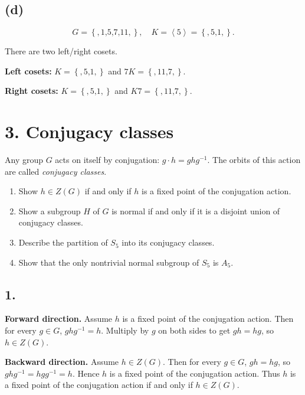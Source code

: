 \subsection{(d)}

\[G = \left\{ {,1\text{,}5\text{,}7\text{,}11,} \right\},\quad K = \left\langle 5 \right\rangle = \left\{ {,5\text{,}1,} \right\}.\]

There are two left/right cosets.

\textbf{Left cosets:} \(K = \left\{ {,5\text{,}1,} \right\}\) and \(7K = \left\{ {,11\text{,}7,} \right\}\).

\textbf{Right cosets:} \(K = \left\{ {,5\text{,}1,} \right\}\) and \(K7 = \left\{ {,11\text{,}7,} \right\}\).

\section{3. Conjugacy classes}

Any group \(G\) acts on itself by conjugation: \(g \cdot h = ghg^{- 1}\). The orbits of this action are called \emph{conjugacy classes}.

\begin{enumerate}
\tightlist
\item
  Show \(h \in Z(G)\) if and only if \(h\) is a fixed point of the conjugation action.
\item
  Show a subgroup \(H\) of \(G\) is normal if and only if it is a disjoint union of conjugacy classes.
\item
  Describe the partition of \(S_{5}\) into its conjugacy classes.
\item
  Show that the only nontrivial normal subgroup of \(S_{5}\) is \(A_{5}\).
\end{enumerate}

\subsection{1.}

\textbf{Forward direction.} Assume \(h\) is a fixed point of the conjugation action. Then for every \(g \in G\), \(ghg^{- 1} = h\). Multiply by \(g\) on both sides to get \(gh = hg\), so \(h \in Z(G)\).

\textbf{Backward direction.} Assume \(h \in Z(G)\). Then for every \(g \in G\), \(gh = hg\), so \(ghg^{- 1} = hgg^{- 1} = h\). Hence \(h\) is a fixed point of the conjugation action. Thus \(h\) is a fixed point of the conjugation action if and only if \(h \in Z(G)\).

